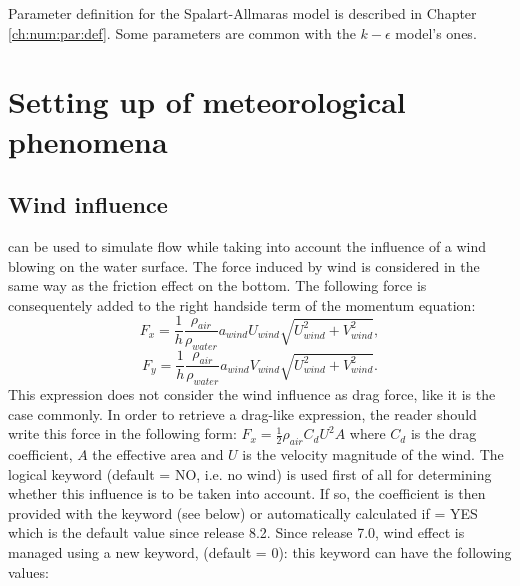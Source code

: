 Parameter definition for the Spalart-Allmaras model is described in Chapter
\ref{ch:num:par:def}.
Some parameters are common with the $k-\epsilon$ model's ones.


\section{Setting up of meteorological phenomena}
\label{sec:param:met:phen}

\subsection{Wind influence}

 can be used to simulate flow while taking into account the
influence of a wind blowing on the water surface.
The force induced by wind is considered in the same way as the friction effect
on the bottom.
The following force is consequentely added to the right handside term of the
momentum equation:
\begin{equation}
F_x = \frac{1}{h} \frac{\rho_{air}}{\rho_{water}}a_{wind}U_{wind}\sqrt{U^2_{wind}+V^2_{wind}},
\end{equation}
\begin{equation}
F_y = \frac{1}{h} \frac{\rho_{air}}{\rho_{water}}a_{wind}V_{wind}\sqrt{U^2_{wind}+V^2_{wind}}.
\end{equation}
This expression does not consider the wind influence as drag force,
like it is the case commonly.
In order to retrieve a drag-like expression, the reader should write this force
in the following form:
$F_x = \frac{1}{2}\rho_{air}C_d U^2 A$ where $C_d$ is the drag coefficient,
$A$ the effective area and $U$ is the velocity magnitude of the wind.
The logical keyword  (default = NO, i.e. no wind) is used first of
all for determining whether this influence is to be taken into account.
If so, the coefficient is then provided with the keyword
 (see below) or automatically calculated
if  = YES
which is the default value since release 8.2.
Since release 7.0, wind effect is managed using a new keyword,
 (default = 0): this keyword can have the following
values:

